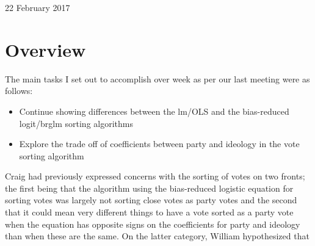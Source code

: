 \documentclass[12pt]{article}
\begin{document}
\begin{center}
\Large 22 February 2017
\end{center}

\section{Overview}

The main tasks I set out to accomplish over week as per our last meeting were as follows:

\begin{itemize}
	\item Continue showing differences between the lm/OLS and the bias-reduced logit/brglm sorting algorithms

	\item Explore the trade off of coefficients between party and ideology in the vote sorting algorithm
\end{itemize}

\noindent
Craig had previously expressed concerns with the sorting of votes on two fronts; the first being that the algorithm using the bias-reduced logistic equation for sorting votes was largely not sorting close votes as party votes and the second that it could mean very different things to have a vote sorted as a party vote when the equation has opposite signs on the coefficients for party and ideology than when these are the same. On the latter category, William hypothesized that 
\end{document}

